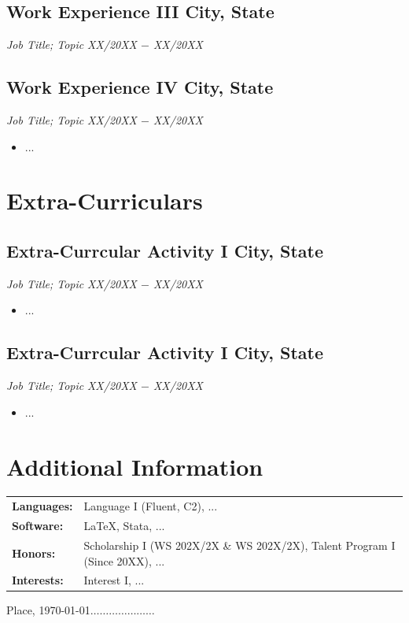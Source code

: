 \documentclass[10pt,letterpaper]{article}						%
\newcommand{\NameDate}[2]{%
  \subsection[#1]{#1 \hfill #2}%
}
\newcommand{\Jobtitle}[2]{%
    \textit{#1} \hfill \textit{#2} \\[-6.25mm]%
}
\newcommand{\JobtitleNoBullets}[2]{%
    \textit{#1} \hfill \textit{#2} \\[-2.5mm]%
}
\newcommand{\myitem}{\item[\tiny$\blacksquare$]}
\newcommand{\onebullets}[1]{%
    \begin{itemize}
        \setlength\itemsep{-0.35em}
        \myitem #1
    \end{itemize}%
}
\begin{document}
\NameDate{Work Experience III}{City, State}
\JobtitleNoBullets{Job Title; Topic}{XX/20XX $-$ XX/20XX}


\NameDate{Work Experience IV}{City, State}
\Jobtitle{Job Title; Topic}{XX/20XX $-$ XX/20XX}
\onebullets{...}


 

\section{Extra-Curriculars}
\NameDate{Extra-Currcular Activity I}{City, State}
\Jobtitle{Job Title; Topic}{XX/20XX $-$ XX/20XX}
\onebullets{...}

\NameDate{Extra-Currcular Activity I}{City, State}
\Jobtitle{Job Title; Topic}{XX/20XX $-$ XX/20XX} 
\onebullets{...}


\section{Additional Information}
\hspace{-0.2cm}\begin{tabularx}{18.4cm}{lX}						%

\textbf{Languages:}
& Language I (Fluent, C2),  ...\\

\textbf{Software:}
& \LaTeX, Stata,  ... \\

\textbf{Honors:}
& Scholarship I (WS 202X/2X \& WS 202X/2X),  Talent Program I (Since 20XX),  ...\\

\textbf{Interests:}
& Interest I,  ...

\end{tabularx}


\vfill
\noindent
\hfill {\footnotesize Place,  \today $\ldots\ldots\ldots\ldots\ldots\ldots\ldots$}	%
\end{document}
